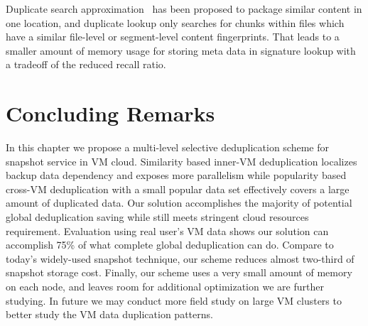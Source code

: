 Duplicate  search approximation~\cite{extreme_binning09,sparseindex09,Xia2011}  has been proposed 
to package similar content in one location, and duplicate lookup  only searches
for chunks within files which have a similar file-level or segment-level  content fingerprints.
That leads  to a smaller amount of memory usage for storing meta data in signature
lookup with a tradeoff of the reduced recall ratio.

\section{Concluding Remarks}
\label{inline:concl}
In this chapter we propose a multi-level selective deduplication scheme for 
snapshot service in VM cloud. 
Similarity based inner-VM deduplication localizes backup data dependency and exposes more parallelism  
while popularity based cross-VM deduplication with a small popular data set
effectively  covers a large amount of duplicated data.
Our solution accomplishes the majority of
potential global deduplication saving while still meets stringent cloud resources requirement. 
Evaluation using real user's VM data shows
our solution can accomplish 75\% of what complete global
deduplication can do. 
Compare to today's widely-used snapshot technique, our scheme reduces almost
two-third of snapshot storage cost.
Finally, our scheme uses a very small amount of memory on each node, and leaves
room for additional optimization we are further studying.
In future we may conduct more field study on large VM clusters to better study the 
VM data duplication patterns.